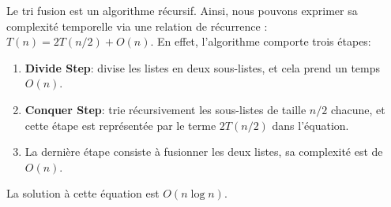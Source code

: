 \begin{Exercice} [30 minutes] [Python]
    \begin{solution}
        Le tri fusion est un algorithme récursif. Ainsi, nous pouvons exprimer sa complexité temporelle via une relation de récurrence : $T(n) = 2T(n/2) + O(n)$. En effet, l'algorithme comporte trois étapes:
        \begin{enumerate}
            \item \textbf{Divide Step}: divise les listes en deux sous-listes, et cela prend un temps $O(n)$.
            \item \textbf{Conquer Step}: trie récursivement les sous-listes de taille $n/2$ chacune, et cette étape est représentée par le terme $2T(n/2)$ dans l'équation.
            \item La dernière étape consiste à fusionner les deux listes, sa complexité est de $O(n)$.
        \end{enumerate}
        La solution à cette équation est $O(n \log n)$.
    \end{solution}
\end{Exercice}


